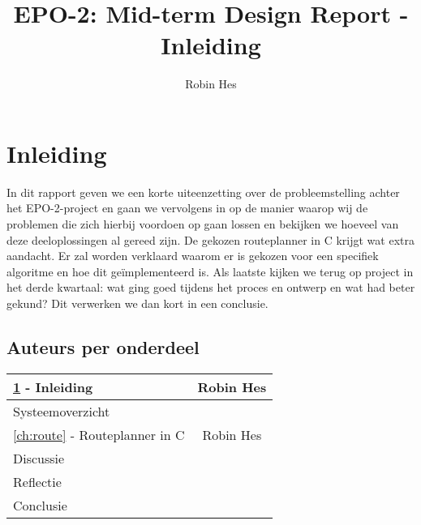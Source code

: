 \documentclass{report}
\title{EPO-2: Mid-term Design Report - Inleiding}
\author{Robin Hes}
\begin{document}
\chapter{Inleiding}
\label{ch:inleiding}

In dit rapport geven we een korte uiteenzetting over de probleemstelling achter het EPO-2-project en gaan we vervolgens in op de manier waarop wij de problemen die zich hierbij voordoen op gaan lossen en bekijken we hoeveel van deze deeloplossingen al gereed zijn. De gekozen routeplanner in C krijgt wat extra aandacht. Er zal worden verklaard waarom er is gekozen voor een specifiek algoritme en hoe dit geïmplementeerd is. Als laatste kijken we terug op project in het derde kwartaal: wat ging goed tijdens het proces en ontwerp en wat had beter gekund? Dit verwerken we dan kort in een conclusie. 

\section{Auteurs per onderdeel}

\begin{tabular}[l]{| l | c |}
	\hline
	\ref{ch:inleiding} - Inleiding & Robin Hes \\
	\hline
	Systeemoverzicht & \\
	\hline
	\ref{ch:route} - Routeplanner in C & Robin Hes \\
	\hline
	Discussie & \\
	\hline
	Reflectie & \\
	\hline
	Conclusie & \\
	\hline	
\end{tabular}
\end{document}
